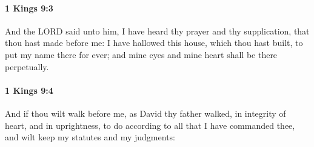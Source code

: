 		\paragraph{1 Kings 9:3} %
			\label{1KINGS-9-3}

			And the LORD said unto him, I have heard thy prayer and thy supplication, that thou hast made before me: I have hallowed this house, which thou hast built, to put my name there for ever; and mine eyes and mine heart shall be there perpetually.


		\paragraph{1 Kings 9:4} %
			\label{1KINGS-9-4}

			And if thou wilt walk before me, as David thy father walked, in integrity of heart, and in uprightness, to do according to all that I have commanded thee, and wilt keep my statutes and my judgments:

